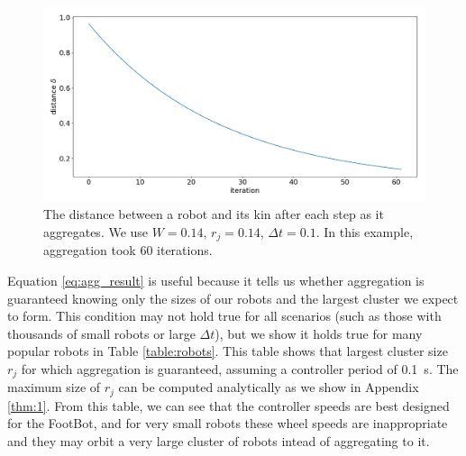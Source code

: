 \documentclass[conference]{IEEEtran}
\begin{document}
    \begin{figure}
      \centering
      \includegraphics[width=1\linewidth]{./images/dist_plot.png}
      \caption{The distance between a robot and its kin after each step as it aggregates. We use $W=0.14$, $r_j=0.14$, $\Delta t=0.1$. In this example, aggregation took 60 iterations.}
      \label{fig:dist_plot}
    \end{figure}

    Equation \ref{eq:agg_result} is useful because it tells us whether aggregation is guaranteed knowing only the sizes of our robots and the largest cluster we expect to form. This condition may not hold true for all scenarios (such as those with thousands of small robots or large $\Delta t$), but we show it holds true for many popular robots in Table \ref{table:robots}. This table shows that largest cluster size $r_j$ for which aggregation is guaranteed, assuming a controller period of \SI{0.1}{\second}. The maximum size of $r_j$ can be computed analytically as we show in Appendix \ref{thm:1}. From this table, we can see that the controller speeds are best designed for the FootBot, and for very small robots these wheel speeds are inappropriate and they may orbit a very large cluster of robots intead of aggregating to it. %
\end{document}

